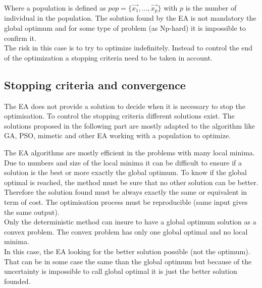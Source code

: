 Where  a population is defined as $pop=\{\vec{x_1}, ...,\vec{x_p}  \}$ with $p$ is the number of individual in the population. 
The solution found by the EA is not mandatory the global optimum and for some type of problem (as Np-hard) it is impossible to confirm it. \\
The risk in this case is to try to optimize indefinitely. Instead to control the end of the optimization a stopping criteria  need to be taken in account.

\subsection{Stopping criteria and convergence}
 
The EA does not provide a solution to decide when it is necessary to stop the optimisation. 
To control the stopping criteria different solutions exist. The solutions proposed in the following part are mostly adapted to the algorithm like GA, PSO, mimetic and other EA working with a population to optimize.


The EA algorithms are mostly efficient in the problems with many local minima. Due to numbers and size of the local minima it can be difficult to ensure if a solution is the best or more exactly the global optimum. 
To know if the global optimal is reached, the method must be sure that no other solution can be better. Therefore the solution found must be always exactly the same or equivalent in term of cost. The optimisation process must be reproducible (same input gives the same output).\\
 Only the deterministic method can insure to have a global optimum solution as a convex problem. The convex problem has only one global optimal and no local minima. \\%
  In this case, the EA looking for the better solution possible (not the optimum). That can be in some case the same than the global optimum but because of the uncertainty is impossible to call global optimal it is just the better solution founded.  
 
